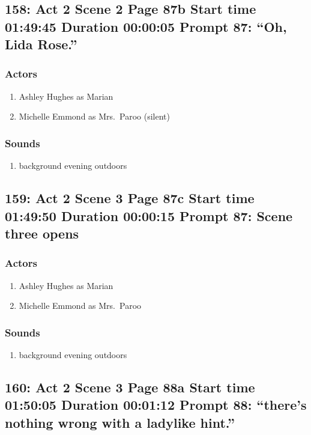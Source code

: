 \subsection{158: Act 2 Scene 2 Page 87b Start time 01:49:45 Duration 00:00:05 Prompt 87: ``Oh, Lida Rose.''}

\subsubsection{Actors}
\begin{enumerate}
\item Ashley Hughes as Marian
\item Michelle Emmond as Mrs.~Paroo (silent)
\end{enumerate}

\subsubsection{Sounds}
\begin{enumerate}
\item background evening outdoors
\end{enumerate}
\subsection{159: Act 2 Scene 3 Page 87c Start time 01:49:50 Duration 00:00:15 Prompt 87: Scene three opens}

\subsubsection{Actors}
\begin{enumerate}
\item Ashley Hughes as Marian
\item Michelle Emmond as Mrs.~Paroo
\end{enumerate}

\subsubsection{Sounds}
\begin{enumerate}
\item background evening outdoors
\end{enumerate}
\subsection{160: Act 2 Scene 3 Page 88a Start time 01:50:05 Duration 00:01:12 Prompt 88: ``there's nothing wrong with a ladylike hint.''}

